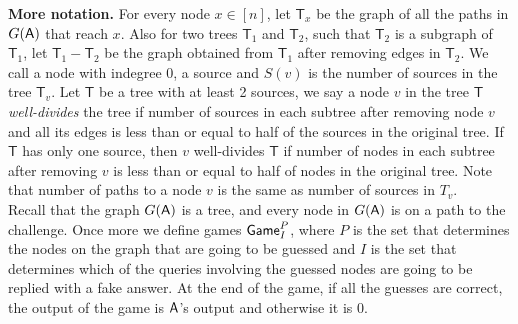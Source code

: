 \documentclass{article}
\def\A{{\sf A}}
\newcommand{\game}{{\sf Game}}
\newcommand{\T}{{\mathsf T}}
\newcommand{\gpi}{$\game^P_I$}
\begin{document}
\noindent \textbf{More notation.} For every node $x\in [n]$, let $\T_x$ be the graph of all the paths in $G(\A)$ that reach $x$. Also for two trees $\T_1$ and $\T_2$, such that $\T_2$ is a subgraph of $\T_1$, let $\T_1-\T_2$ be the graph obtained from $\T_1$ after removing edges in $\T_2$. We call a node with indegree 0, a source and $S(v)$ is the number of sources in the tree $\T_v$.  Let $\T$ be a tree with at least 2 sources, we say a node $v$ in the tree $\T$ \textit{well-divides} the tree if number of sources in each subtree after removing node $v$ and all its edges is less than or equal to half of the sources in the original tree. If $\T$ has only one source, then $v$ well-divides $\T$ if number of nodes in each subtree after removing $v$ is less than or equal to half of nodes in the original tree. Note that number of paths to a node $v$ is the same as number of sources in $T_v$.\\

\noindent Recall that the graph $G(\A)$ is a tree, and every node in $G(\A)$ is on a path to the challenge. Once more we define games \gpi, where $P$ is the set that determines the nodes on the graph that are going to be guessed and $I$ is the set that determines which of the queries involving the guessed nodes are going to be replied with a fake answer. At the end of the game, if all the guesses are correct, the output of the game is $\A$'s output and otherwise it is 0.\\
\end{document}
